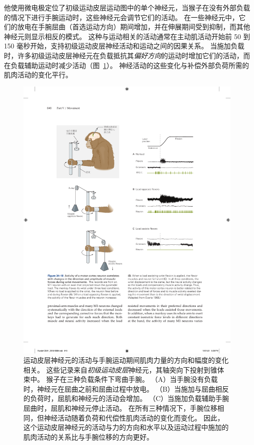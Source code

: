 他使用微电极定位了初级运动皮层运动图中的单个神经元，当猴子在没有外部负载的情况下进行手腕运动时，这些神经元会调节它们的活动。
在一些神经元中，它们的放电在手腕屈曲（首选运动方向）期间增加，并在伸展期间受到抑制，而其他神经元则显示相反的模式。
这种与运动相关的活动通常在主动肌活动开始前 50 到 150 毫秒开始，支持初级运动皮层神经活动和运动之间的因果关系。
当施加负载时，许多初级运动皮层神经元在负载抵抗其\textit{偏好方向}的运动时增加它们的活动，而在负载辅助运动时减少活动（图~\ref{fig:34_18}）。
神经活动的这些变化与补偿外部负荷所需的肌肉活动的变化平行。


\begin{figure}[htbp]
	\centering
	\includegraphics[width=1.0\linewidth]{chap34/fig_34_18}
	\caption{运动皮层神经元的活动与手腕运动期间肌肉力量的方向和幅度的变化相关。
		这些记录来自\textit{初级运动皮层}神经元，其轴突向下投射到锥体束中。
		猴子在三种负载条件下弯曲手腕。
		（A）当手腕没有负载时，神经元在屈曲之前和屈曲过程中放电。
		（B）当施加与屈曲相反的负荷时，屈肌和神经元的活动会增加。
		（C）当施加负载辅助手腕屈曲时，屈肌和神经元停止活动。
		在所有三种情况下，手腕位移相同，但神经活动随着负荷和代偿性肌肉活动的变化而变化。
		因此，这个运动皮层神经元的活动与力的方向和水平以及运动过程中施加的肌肉活动的关系比与手腕位移的方向更好\cite{evarts1968relation}。}
	\label{fig:34_18}
\end{figure}


